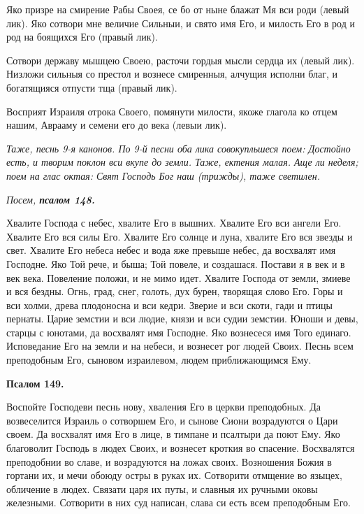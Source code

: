 Яко призре на смирение Рабы Своея, се бо от ныне блажат Мя вси роди (левый лик). Яко сотвори мне величие Сильныи, и свято имя Его, и милость Его в род и род на боящихся Его (правый лик). 

Сотвори державу мышцею Своею, расточи гордыя мысли сердца их (левый лик). Низложи сильныя со престол и вознесе смиренныя, алчущия исполни благ, и богатящияся отпусти тща (правый лик). 

Восприят Израиля отрока Своего, помянути милости, якоже глагола ко отцем нашим, Аврааму и семени его до века (левыи лик).


\itshape Таже, песнь 9-я канонов. По 9-й песни оба лика совокупльшеся поем:\normalfont{} Достойно есть, и творим поклон вси вкупе до земли. Таже, ектения малая. Аще ли неделя; поем на глас октая: Свят Господь Бог наш (трижды), таже светилен.


\medskip


\itshape Посем, \bfseries псалом 148\normalfont{}.\normalfont{}


Хвалите Господа с небес, хвалите Его в вышних. Хвалите Его вси ангели Его. Хвалите Его вся силы Его. Хвалите Его солнце и луна, хвалите Его вся звезды и свет. Хвалите Его небеса небес и вода яже превыше небес, да восхвалят имя Господне. Яко Той рече, и быша; Той повеле, и создашася. Постави я в век и в век века. Повеление положи, и не мимо идет. Хвалите Господа от земли, змиеве и вся бездны. Огнь, град, снег, голоть, дух бурен, творящая слово Его. Горы и вси холми, древа плодоносна и вси кедри. Зверие и вси скоти, гади и птицы пернаты. Царие земстии и вси людие, князи и вси судии земстии. Юноши и девы, старцы с юнотами, да восхвалят имя Господне. Яко вознесеся имя Того единаго. Исповедание Его на земли и на небеси, и вознесет рог людей Своих. Песнь всем преподобным Его, сыновом израилевом, людем приближающимся Ему.


\medskip


\bfseries Псалом 149.\normalfont{}\nopagebreak


Воспойте Господеви песнь нову, хваления Его в церкви преподобных. Да возвеселится Израиль о сотворшем Его, и сынове Сиони возрадуются о Цари своем. Да восхвалят имя Его в лице, в тимпане и псалтыри да поют Ему. Яко благоволит Господь в людех Своих, и вознесет кроткия во спасение. Восхвалятся преподобнии во славе, и возрадуются на ложах своих. Возношения Божия в гортани их, и мечи обоюду остры в руках их. Сотворити отмщение во языцех, обличение в людех. Связати царя их путы, и славныя их ручными оковы железными. Сотворити в них суд написан, слава си есть всем преподобным Его.


